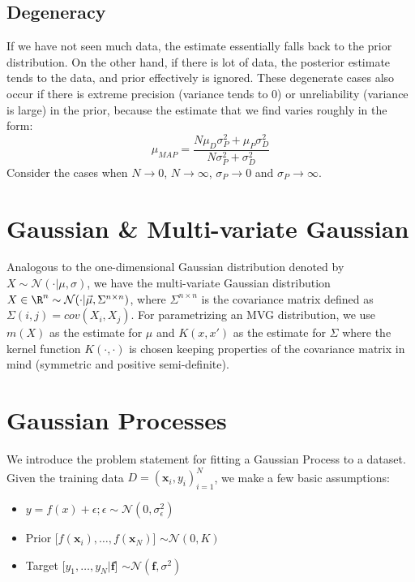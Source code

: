 \documentclass[12pt]{article}
\begin{document}
\subsection{Degeneracy}

If we have not seen much data, the estimate essentially falls back to the prior distribution. On the other hand, if there is lot of data, the posterior estimate tends to the data, and prior effectively is ignored. These degenerate cases also occur if there is extreme precision (variance tends to 0) or unreliability (variance is large) in the prior, because the estimate that we find varies roughly in the form: \[ \mu_{MAP} = \frac{N \mu_D \sigma_P ^ 2 + \mu_P \sigma_D ^ 2}{N \sigma_P ^ 2 + \sigma_D ^ 2} \]
Consider the cases when $N \rightarrow 0$, $N \rightarrow \infty$, $\sigma_P \rightarrow 0$ and $\sigma_P \rightarrow \infty$.

\section{Gaussian \& Multi-variate Gaussian}

Analogous to the one-dimensional Gaussian distribution denoted by $X \sim \mathcal{N}(\cdot | \mu, \sigma)$, we have the multi-variate Gaussian distribution $X \in \R^n \sim \mathcal{N}(\cdot | \vec{\mu}, \Sigma^{n \times n})$, where $\Sigma^{n \times n}$ is the covariance matrix defined as $\Sigma(i,j) = cov(X_i,X_j)$. For parametrizing an MVG distribution, we use $m(X)$ as the estimate for $\mu$ and $K(x,x')$ as the estimate for $\Sigma$ where the kernel function $K(\cdot,\cdot)$ is chosen keeping properties of the covariance matrix in mind (symmetric and positive semi-definite).

\section{Gaussian Processes}

We introduce the problem statement for fitting a Gaussian Process to a dataset. Given the training data $\displaystyle D = {(\mathbf{x}_i,y_i)}_{i = 1}^N$, we make a few basic assumptions:

\begin{itemize}
    \item $y = f(x) + \epsilon; \epsilon \sim \mathcal{N}(0,\sigma_\epsilon^2)$
    \item Prior [$f(\mathbf{x}_i), \dots, f(\mathbf{x}_N)$] $\sim \mathcal{N}(0,K)$
    \item Target [$y_1, \dots, y_N | \mathbf{f}$] $\sim \mathcal{N}(\mathbf{f},\sigma^2)$
\end{itemize}
\end{document}
